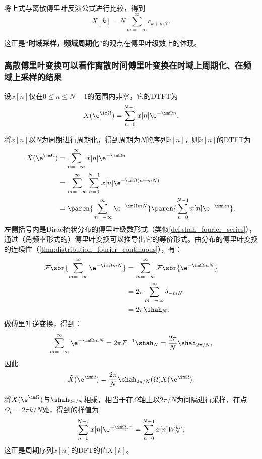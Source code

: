 将上式与离散傅里叶反演公式进行比较，得到
\begin{equation}
    X[k]=N\sum_{m=-\infty}^{\infty}c_{k+mN}.
\end{equation}

这正是“\textbf{时域采样，频域周期化}”的观点在傅里叶级数上的体现。

\subsubsection{离散傅里叶变换可以看作离散时间傅里叶变换在时域上周期化、在频域上采样的结果}

设$x[n]$仅在$0\leq n\leq N-1$的范围内非零，它的DTFT为
\begin{equation}
    X(\e^{\im\Omega})=\sum_{n=0}^{N-1}x[n]\e^{-\im\Omega n}.
\end{equation}

将$x[n]$以$N$为周期进行周期化，得到周期为$N$的序列$\tilde{x}[n]$，则$\tilde{x}[n]$的DTFT为
\begin{align}
    \tilde{X}(\e^{\im\Omega})&=\sum_{n=-\infty}^{\infty}\tilde{x}[n]\e^{-\im\Omega n} \nonumber \\
    &=\sum_{m=-\infty}^{\infty}\sum_{n=0}^{N-1}x[n]\e^{-\im\Omega (n+mN)} \nonumber \\
    &=\paren{\sum_{m=-\infty}^{\infty}\e^{-\im\Omega mN}}\paren{\sum_{n=0}^{N-1}x[n]\e^{-\im\Omega n}}.
\end{align}
左侧括号内是Dirac梳状分布的傅里叶级数形式（类似\cref{def:shah_fourier_series}），通过（角频率形式的）傅里叶变换可以推导出它的等价形式。由分布的傅里叶变换的连续性（\cref{thm:distribution_fourier_continuous}），有：
\begin{align}
    \mathcal{F}\sbr{\sum_{m=-\infty}^{\infty}\e^{-\im\Omega mN}}&=\sum_{m=-\infty}^{\infty}\mathcal{F}\sbr{\e^{-\im\Omega mN}} \nonumber \\
    &=2\pi\sum_{m=-\infty}^{\infty}\delta_{-mN} \nonumber \\
    &=2\pi\shah_{N}.
\end{align}
做傅里叶逆变换，得到：
\begin{equation}
    \sum_{m=-\infty}^{\infty}\e^{-\im\Omega mN}=2\pi\mathcal{F}^{-1}\shah_{N}=\frac{2\pi}{N}\shah_{2\pi/N},
\end{equation}
因此
\begin{equation}
    \tilde{X}(\e^{\im\Omega})=\frac{2\pi}{N}\shah_{2\pi/N}(\Omega)X(\e^{\im\Omega}).
\end{equation}

将$X(\e^{\im\Omega})$与$\shah_{2\pi/N}$相乘，相当于在$\Omega$轴上以$2\pi/N$为间隔进行采样，在点$\Omega_k=2\pi k/N$处，得到的样值为
\begin{equation}
    \sum_{n=0}^{N-1}x[n]\e^{-\im\Omega_k n}=\sum_{n=0}^{N-1}x[n]W_N^{kn},
\end{equation}
这正是周期序列$\tilde{x}[n]$的DFT的值$X[k]$。

